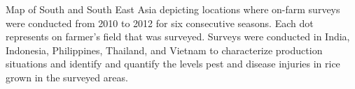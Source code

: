 Map of South and South East Asia depicting locations where on-farm surveys were conducted from 2010 to 2012 for six consecutive seasons. Each dot represents on farmer’s field that was surveyed. Surveys were conducted in India, Indonesia, Philippines, Thailand, and Vietnam to characterize production situations and identify and quantify the levels pest and disease injuries in rice grown in the surveyed areas.